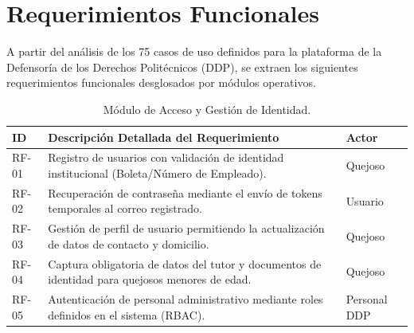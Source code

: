 \section{Requerimientos Funcionales}

A partir del análisis de los 75 casos de uso definidos para la plataforma de la Defensoría de los Derechos Politécnicos (DDP), se extraen los siguientes requerimientos funcionales desglosados por módulos operativos.

\begin{table}[h!]
\centering
\scriptsize
\caption{Módulo de Acceso y Gestión de Identidad.}
\label{tab:rf_acceso}
\begin{tabular}{@{} l p{9.5cm} l @{}}
\toprule
\rowcolor[HTML]{2D3E50} 
\textbf{\color[HTML]{FFFFFF} ID} & \textbf{\color[HTML]{FFFFFF} Descripción Detallada del Requerimiento} & \textbf{\color[HTML]{FFFFFF} Actor} \\ \midrule
RF-01 & Registro de usuarios con validación de identidad institucional (Boleta/Número de Empleado). & Quejoso \\
\rowcolor[HTML]{F2F4F7} 
RF-02 & Recuperación de contraseña mediante el envío de tokens temporales al correo registrado. & Usuario \\
RF-03 & Gestión de perfil de usuario permitiendo la actualización de datos de contacto y domicilio. & Quejoso \\
\rowcolor[HTML]{F2F4F7} 
RF-04 & Captura obligatoria de datos del tutor y documentos de identidad para quejosos menores de edad. & Quejoso \\
RF-05 & Autenticación de personal administrativo mediante roles definidos en el sistema (RBAC). & Personal DDP \\ \bottomrule
\end{tabular}
\end{table}

